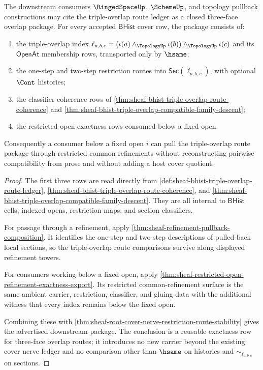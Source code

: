 \begin{theorem}
\label{thm:sheaf-bhist-triple-overlap-downstream-exactness}
The downstream consumers $\RingedSpaceUp$, $\SchemeUp$, and topology pullback constructions may cite the triple-overlap route ledger as a closed three-face overlap package. For every accepted $\mathsf{BHist}$ cover row, the package consists of:
\begin{enumerate}
\item the triple-overlap index $\ell_{a,b,c}=(\iota(a)\wedge_{\TopologyUp}\iota(b))\wedge_{\TopologyUp}\iota(c)$ and its $\mathsf{OpenAt}$ membership rows, transported only by $\hsame$;
\item the one-step and two-step restriction routes into $\mathsf{Sec}(\ell_{a,b,c})$, with optional $\Cont$ histories;
\item the classifier coherence rows of \autoref{thm:sheaf-bhist-triple-overlap-route-coherence} and \autoref{thm:sheaf-bhist-triple-overlap-compatible-family-descent};
\item the restricted-open exactness rows consumed below a fixed open.
\end{enumerate}
Consequently a consumer below a fixed open $i$ can pull the triple-overlap route package through restricted common refinements without reconstructing pairwise compatibility from prose and without adding a host cover quotient.
\end{theorem}
\begin{proof}
The first three rows are read directly from \autoref{def:sheaf-bhist-triple-overlap-route-ledger}, \autoref{thm:sheaf-bhist-triple-overlap-route-coherence}, and \autoref{thm:sheaf-bhist-triple-overlap-compatible-family-descent}. They are all internal to $\mathsf{BHist}$ cells, indexed opens, restriction maps, and section classifiers.

For passage through a refinement, apply \autoref{thm:sheaf-refinement-pullback-composition}. It identifies the one-step and two-step descriptions of pulled-back local sections, so the triple-overlap route comparisons survive along displayed refinement towers.

For consumers working below a fixed open, apply \autoref{thm:sheaf-restricted-open-refinement-exactness-export}. Its restricted common-refinement surface is the same ambient carrier, restriction, classifier, and gluing data with the additional witness that every index remains below the fixed open.

Combining these with \autoref{thm:sheaf-root-cover-nerve-restriction-route-stability} gives the advertised downstream package. The conclusion is a reusable exactness row for three-face overlap routes; it introduces no new carrier beyond the existing cover nerve ledger and no comparison other than $\hsame$ on histories and $\sim_{\ell_{a,b,c}}$ on sections.
\end{proof}
